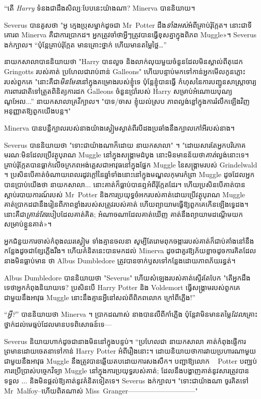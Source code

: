 “តើ \emph{Harry} ទំនង​ជា​ដឹង​សិល្បៈ​បែប​នេះ​យ៉ាង​ណា? Minerva បាននិយាយ។

Severus បានគូសថា "អូ ក្មេងប្រុសម្នាក់ដូចជា Mr~Potter ដឹង\emph{ទាំងអស់}អំពីគ្រាប់រ៉ុក្កែត។ នោះជាទីគោរព Minerva គឺជាការប្រាកដ។ អ្នក​ត្រូវ​ចាំ​ថា​អ្វីៗ​ត្រូវ​បាន​ធ្វើ​ខុស​គ្នា​ក្នុង​ពិភព Muggle»។ Severus ងក់ក្បាល។ “ប៉ុន្តែគ្រាប់រ៉ុក្កែត \emph{} មានគ្រោះថ្នាក់ ហើយមានតម្លៃថ្លៃ…”

នាយកសាលាបាននិយាយថា "Harry បានលួច និងលាក់លុយមួយចំនួនដែលមិនស្គាល់ពីតុដេក Gringotts របស់គាត់ ប្រហែលជារាប់ពាន់ Galleons" ហើយបន្ទាប់មកទៅកាន់អ្នកមើលកូនភ្លោះរបស់ពួកគេ "នោះគឺជា\emph{មិនមែន}នៅក្នុងគម្រោងរបស់ខ្ញុំទេ ប៉ុន្តែខ្ញុំបានធ្វើ កំហុសនៃការបញ្ជូនសាស្រ្តាចារ្យការពារជាតិទៅត្រួតពិនិត្យការដក Galleons ចំនួនប្រាំរបស់ Harry សម្រាប់អំណោយបុណ្យណូអែល...” នាយកសាលាគ្រវីក្បាល។ "បាទ/ចាស ខ្ញុំយល់ស្រប ភាពល្ងង់ខ្លៅក្នុងការរំលឹកឡើងវិញ អនុញ្ញាតឱ្យពួកយើងបន្ត។"

Minerva បានបន្លឺក្បាលរបស់នាងយ៉ាងស្ងៀមស្ងាត់ពីរបីដងប្រឆាំងនឹងក្បាលកៅអីរបស់នាង។

Severus បាននិយាយថា "ទោះជាយ៉ាងណាក៏ដោយ នាយកសាលា" ។ "ដោយសារតែអ្នកបរិភោគមរណៈមិនដែលប្រើវត្ថុបុរាណ Muggle នៅក្នុងសង្រ្គាមដំបូង នោះមិនមានន័យថា\emph{គាត់}ល្ងង់នោះទេ។ គ្រាប់រ៉ុក្កែតបានធ្លាក់លើចក្រភពអង់គ្លេសជាអាវុធនៅក្នុងផ្នែក Muggle នៃសង្គ្រាមរបស់ Grindelwald ។ ប្រសិនបើគាត់ចំណាយពេលរដូវក្តៅនៃឆ្នាំទាំងនោះនៅក្នុងមណ្ឌលកុមារកំព្រា Muggle ដូចដែលអ្នកបានប្រាប់យើងថា នាយកសាលា... នោះគាត់ក៏ធ្លាប់បានឮអំពីរ៉ុក្កែតដែរ។ ហើយប្រសិនបើគាត់បានស្តាប់របាយការណ៍របស់ Mr~Potter និងការប្រយុទ្ធចំអករបស់គាត់ដោយប្រើវត្ថុបុរាណ Muggle គាត់ប្រាកដជានឹងរៀនពីភាពខ្លាំងរបស់សត្រូវរបស់គាត់ ហើយព្យាយាមធ្វើឱ្យពួកគេកើនឡើងទ្វេដង។ នោះគឺជា\emph{គ្រាន់តែ}របៀបដែលគាត់គិត; អំណាច​ណា​ដែល​គាត់​ឃើញ គាត់​នឹង​ព្យាយាម​ដណ្តើម​យក​សម្រាប់​ខ្លួន​គាត់»។

អ្នកជំនួយការចាស់កំពុងឈរស្ងៀម ទាំងគ្មានចលនា សូម្បីតែរោមពុកចង្ការរបស់គាត់ក៏ជាប់គាំងនៅនឹងកន្លែងដូចជាខ្សែភ្លើងរឹង។ ហើយគំនិតនេះបានមកដល់ Minerva ដូចជាគួរឱ្យភ័យខ្លាចដូចការគិតដែលនាងមិនធ្លាប់មាន ថា Albus Dumbledore ត្រូវបានចាក់ឫសទៅកន្លែងដោយភាពភ័យរន្ធត់។

Albus Dumbledore បាននិយាយថា "Severus" ហើយសំឡេងរបស់គាត់ស្ទើរតែបែក "តើអ្នកដឹងទេថាអ្នកកំពុងនិយាយទេ? ប្រសិនបើ Harry Potter និង Voldemort ធ្វើសង្រ្គាមរបស់ពួកគេជាមួយនឹងអាវុធ Muggle នោះនឹងគ្មានអ្វីនៅសល់ពីពិភពលោក ក្រៅពីភ្លើង!”

“\emph{អ្វី?}” បាននិយាយថា Minerva ។ ប្រាកដណាស់ នាងបានលឺពីកាំភ្លើង ប៉ុន្តែវាមិនមានតម្លៃ\emph{ដែល}គ្រោះថ្នាក់ដល់មេធ្មប់ដែលមានបទពិសោធន៍ទេ—

Severus និយាយហាក់ដូចជានាងមិននៅក្នុងបន្ទប់។ “ប្រហែលជា នាយកសាលា គាត់កំពុងផ្ញើការព្រមានដោយចេតនាទៅកាន់ Harry Potter អំពីរឿងនោះ។ ដោយនិយាយថាការវាយប្រហារណាមួយជាមួយនឹងអាវុធ Muggle នឹងត្រូវបានឆ្លើយតបដោយការសងសឹក។ បញ្ជាឱ្យលោក ~ Potter បញ្ឈប់ការប្រើប្រាស់បច្ចេកវិទ្យា Muggle នៅក្នុងការប្រយុទ្ធរបស់គាត់; ដែលនឹងបង្ហាញគាត់នូវសារត្រូវបានទទួល ... និងមិនផ្តល់ឱ្យគាត់នូវគំនិតទៀតទេ។ Severus ងក់ក្បាល។ "ទោះជាយ៉ាងណា ចូរគិតទៅ Mr~Malfoy--ហើយពិតណាស់ Miss~Granger-----------------------------"


